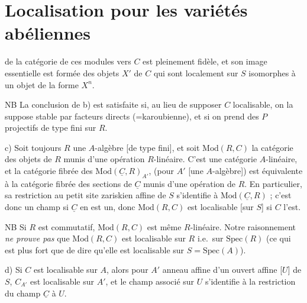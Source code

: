 \documentclass[11pt,a4paper]{article}
\begin{document}
\section{Localisation pour les variétés abéliennes}


de la catégorie de ces modules vers $C$ est pleinement fidèle, et son image
essentielle est formée des objets $X'$ de $C$ qui sont localement sur $S$
isomorphes à un objet de la forme $X^n$.

NB La conclusion de b) est satisfaite si, au lieu de supposer $C$
localisable, on la suppose stable par facteurs directs (=karoubienne), et
 si on prend des $P$ projectifs de type fini sur $R$.

c) Soit toujours $R$ une $A$-algèbre [de type fini], et soit
$\mathrm{Mod}(R,C)$ la catégorie des objets de $R$ munis d'une opération $R$-linéaire.
C'est une catégorie $A$-linéaire, et la catégorie fibrée des
$\mathrm{Mod}(\underline{C},R)_{A'}$, (pour $A'$ \struck{\ill{}} [une
$A$-algèbre]) 
est équivalente à la catégorie fibrée des sections de $\underline{C}$
munis d'une opération de $R$. En particulier, sa restriction au
 petit site zariskien affine de $S$  s'identifie à
$\mathrm{Mod}(\underline{C},R)$ ; c'est donc un champ si $\underline{C}$ en
est un, donc $\mathrm{Mod}(R,C)$ est localisable [sur $S$] si $C$ l'est.

NB Si $R$ est commutatif, $\mathrm{Mod}(R,C)$ est même $R$-linéaire. Notre
raisonnement \emph{ne prouve pas} que  $\mathrm{Mod}(R,C)$ est
localisable sur $R$ i.e.\ sur $\mathrm{Spec}(R)$ (ce qui est plus fort que
de dire qu'elle est localisable sur $S = \mathrm{Spec}(A)$).

d)  Si $C$ est localisable
sur $A$, alors pour $A'$  anneau affine d'un ouvert affine
[$U$] de $S$, $C_{A'}$ est localisable sur $A'$, et le champ associé sur
$U$ s'identifie à la restriction du champ $\underline{C}$ à $U$.
\end{document}
